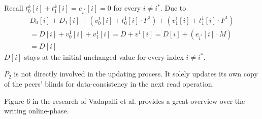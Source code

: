 Recall $t_0^k[i]+t_1^k[i]=e_{i^*}[i]=0$ for every $i\neq i^*$.
Due to
\begin{align*}
    D_0[i]+D_1[i]+(v_0^1[i]+t_0^1[i]\cdot F^1)+(v_1^1[i]+t_1^1[i]\cdot F^1) \\
    = D[i] + v_0^1[i]+v_1^1[i] 
    = D + v^1[i] 
    = D[i] + (e_{i^*}[i]\cdot M) \\
    = D[i]
\end{align*}
$D[i]$ stays at the initial unchanged value for every index $i\neq i^*$.

$P_2$ is not directly involved in the updating process. 
It solely updates its own copy of the peers' blinds for data-consistency in the next read operation.

Figure 6 in the research of Vadapalli et al. \cite{vadapalli2023duoram} provides a great overview over the writing online-phase.